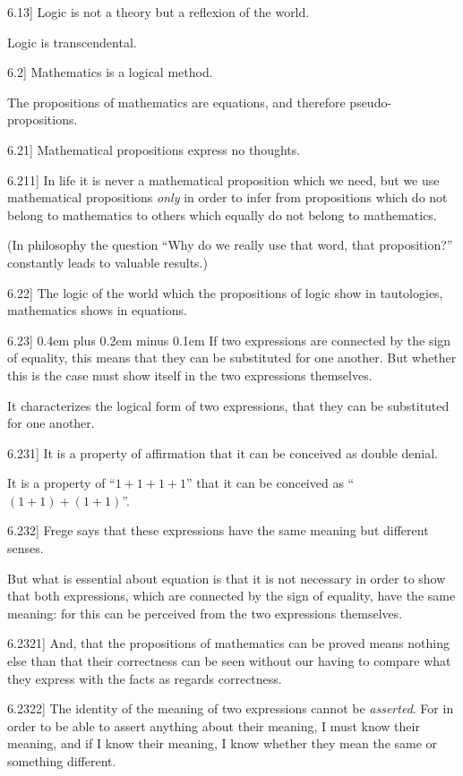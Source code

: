 \documentclass[12pt,oneside]{book}[2007/10/19]
\newcommand{\PropositionE}[2]{%
  \item[\phantomsection\label{PropE:#1}\PropGRef{#1}] #2%
}
\newcommand{\PropGRef}[1]{\hyperref[PropG:#1]{#1}}
\newcommand{\stretchyspace}{\spaceskip0.4em plus 0.2em minus 0.1em}
\begin{document}
\begin{propositions}
\PropositionE{6.13}
{Logic is not a theory but a reflexion of the
world.

Logic is transcendental.}


\PropositionE{6.2}
{Mathematics is a logical method.

The propositions of mathematics are equations,
and therefore pseudo-prop\-o\-si\-tions.}


\PropositionE{6.21}
{Mathematical propositions express no thoughts.}


\PropositionE{6.211}
{In life it is never a mathematical proposition
which we need, but we use mathematical propositions
\emph{only} in order to infer from propositions
which do not belong to mathematics to others
which equally do not belong to mathematics.

(In philosophy the question ``Why do we really
use that word, that proposition?'' constantly leads
to valuable results.)}


\PropositionE{6.22}
{The logic of the world which the propositions
of logic show in tautologies, mathematics shows
in equations.}


\PropositionE{6.23}
{{\stretchyspace
If two expressions are connected by the sign of
equality, this means that they can be substituted
for one another. But whether this is the case
must show itself in the two expressions themselves.}

It characterizes the logical form of two expressions,
that they can be substituted for one
another.}


\PropositionE{6.231}
{It is a property of affirmation that it can be
conceived as double denial.

It is a property of ``$1 + 1 + 1 + 1$'' that it can be
conceived as ``$(1 + 1) + (1 + 1)$''.}


\PropositionE{6.232}
{Frege says that these expressions have the same
meaning but different senses.

But what is essential about equation is that it
is not necessary in order to show that both expressions,
which are connected by the sign of
equality, have the same meaning: for this can be
perceived from the two expressions themselves.}


\PropositionE{6.2321}
{And, that the propositions of mathematics can
be proved means nothing else than that their
correctness can be seen without our having to
compare what they express with the facts as regards
correctness.}


\PropositionE{6.2322}
{The identity of the meaning of two expressions
cannot be \emph{asserted}. For in order to be able to
assert anything about their meaning, I must know
their meaning, and if I know their meaning, I
know whether they mean the same or something
different.}



\end{propositions}
\end{document}

